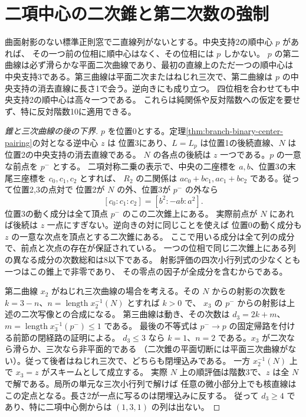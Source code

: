 \section{二項中心の二次錐と第二次数の強制}
\label{sec:binary-centers-quadric-cones}
\begin{theorem}\label{thm:binary-centers-quadric-cones}
曲面射影のない標準正則窓で二直線列がないとする。中央支持2の順中心 $p$ があれば、
その一つ前の位相に順中心はなく、その位相には $p$ しかない。
$p$ の第二曲線は必ず滑らかな平面二次曲線であり、最初の直線上のただ一つの順中心は
中央支持3である。第三曲線は平面二次またはねじれ三次で、第二曲線は
$p$ の中央支持の消去直線に長さ1で会う。逆向きにも成り立つ。
四位相を合わせても中央支持2の順中心は高々一つである。
これらは純関係や反対階数への仮定を要せず、特に反対階数10に適用できる。
\end{theorem}
\begin{proof}[錐と三次曲線の後の下界]
$p$ を位置0とする。定理\ref{thm:branch-binary-center-pairing}の対となる逆中心 $z$ は
位置3にあり、$L=L_p$ は位置1の後続直線、$N$ は位置2の中央支持の消去直線である。
$N$ の各点の後続は $z$ 一つである。$p$ の一意な前点を $p^-$ とする。
二項対称二乗の表示で、中央の二座標を $a,b$、位置3の末尾三座標を $c_0,c_1,c_2$ とすれば、
$R_2$ の二関係は $a c_0+b c_1, a c_1+b c_2$ である。従って位置2,3の点対で
位置2が $N$ の外、位置3が $p^-$ の外なら
\[
             [c_0:c_1:c_2]=[b^2:-ab:a^2].
\]
位置3の動く成分は全て頂点 $p^-$ のこの二次錐上にある。
実際前点が $N$ にあれば後続は $z$ 一点にすぎない。逆向きの対に同じことを使えば
位置0の動く成分も $z$ の一意な次点を頂点とする二次錐にある。
ここで用いる成分は全て列の成分で、前点と次点の存在が保証されている。
一つの位相で同じ二次錐上にある列の異なる成分の次数総和は8以下である。
射影評価の四次小行列式の少なくとも一つはこの錐上で非零であり、
その零点の因子が全成分を含むからである。

第二曲線 $x_2$ がねじれ三次曲線の場合を考える。その $N$ からの射影の次数を
$k=3-n$、$n=\operatorname{length}x_2^{-1}(N)$ とすれば $k>0$ で、
$x_3$ の $p^-$ からの射影は上述の二次写像との合成になる。
第三曲線は動き、その次数は $d_3=2k+m$、$m=\operatorname{length}x_3^{-1}(p^-)\le1$ である。
最後の不等式は $p^-\to p$ の固定帰路を付ける前節の閉経路の証明による。
$d_3\le3$ なら $k=1$、$n=2$ である。$x_3$ が二次なら滑らか、三次なら非平面的である
（二次錐の平面切断には平面三次曲線がない）。従って後者はねじれ三次で、どちらも閉埋込みである。
一方 $x_2^{-1}(N)$ 上で $x_3=z$ がスキームとして成立する。
実際 $N$ 上の順評価は階数3で、$z$ は全 $N$ で解である。局所の単元な三次小行列で解けば
任意の微小部分上でも核直線はこの定点となる。長さ2が一点に写るのは閉埋込みに反する。
従って $d_3\ge4$ であり、特に二項中心側からは $(1,3,1)$ の列は出ない。
\end{proof}
